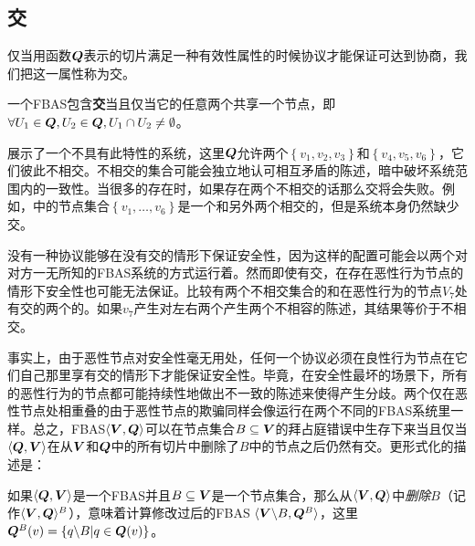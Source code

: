 \subsection{{\quorum}交}\label{sec:quorum_intersect}

仅当用函数${\bm Q}$表示的{\quorum}切片满足一种有效性属性的时候协议才能保证可达到协商，我们把这一属性称为{\quorum}交。

\begin{definition}[{\quorum}交]
	一个FBAS包含\textbf{{\quorum}交}当且仅当它的任意两个{\quorum}共享一个节点，即$\forall U_1\in{\bm Q},U_2\in{\bm Q},U_1\cap U_2\neq\emptyset$。
\end{definition}

展示了一个不具有此特性的系统，这里${\bm Q}$允许两个{\quorum}$\left\{v_1,v_2,v_3\right\}$和$\left\{v_4,v_5,v_6\right\}$，它们彼此不相交。不相交的集合可能会独立地认可相互矛盾的陈述，暗中破坏系统范围内的一致性。当很多的{\quorum}存在时，如果存在两个不相交的话那么{\quorum}交将会失败。例如，中的节点集合$\left\{v_1,\ldots ,v_6\right\}$是一个和另外两个{\quorum}相交的{\quorum}，但是系统本身仍然缺少{\quorum}交。

没有一种协议能够在没有{\quorum}交的情形下保证安全性，因为这样的配置可能会以两个对对方一无所知的FBAS系统的方式运行着。然而即使有{\quorum}交，在存在恶性行为节点的情形下安全性也可能无法保证。比较有两个不相交集合的和在恶性行为的节点$V_7$处有交的两个{\quorum}的。如果$v_7$产生对左右两个{\quorum}产生两个不相容的陈述，其结果等价于不相交{\quorum}。

事实上，由于恶性节点对安全性毫无用处，任何一个协议必须在良性行为节点在它们自己那里享有{\quorum}交的情形下才能保证安全性。毕竟，在安全性最坏的场景下，所有的恶性行为的节点都可能持续性地做出不一致的陈述来使得{\quorum}产生分歧。两个仅在恶性节点处相重叠的{\quorum}由于恶性节点的欺骗同样会像运行在两个不同的FBAS系统里一样。总之，FBAS$\langle {\bm V},{\bm Q}\rangle$可以在节点集合$B\subseteq {\bm V}$的拜占庭错误中生存下来当且仅当$\langle{\bm Q},{\bm V}\rangle$在从${\bm V}$和${\bm Q}$中的所有切片中删除了$B$中的节点之后仍然有{\quorum}交。更形式化的描述是：

\begin{definition}[删除]
	如果$\langle{\bm Q},{\bm V}\rangle$是一个FBAS并且$B\subseteq {\bm V}$是一个节点集合，那么从$\langle{\bm V},{\bm Q}\rangle$中\textit{删除}$B$（记作$\langle{\bm V},{\bm Q}\rangle^B$），意味着计算修改过后的FBAS $\langle{\bm V}\backslash B, {\bm Q}^B\rangle$，这里${\bm Q}^B(v)=\left\{q\backslash B|q\in{\bm Q(v)}\right\}$。
\end{definition}

